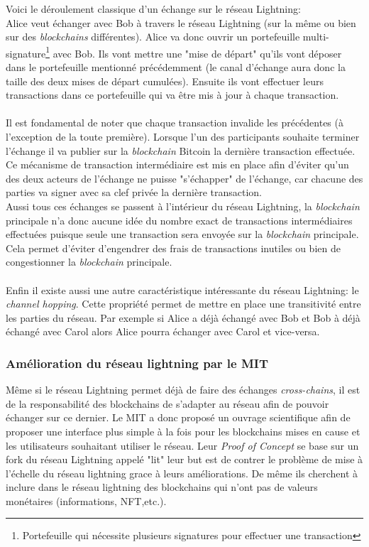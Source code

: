 Voici le déroulement classique d'un échange sur le réseau Lightning:\\ Alice veut échanger avec Bob à travers le réseau Lightning (sur la même ou bien sur des \textit{\gls{blockchain}s} différentes). 
Alice va donc ouvrir un portefeuille multi-signature\footnote{Portefeuille qui nécessite plusieurs signatures pour effectuer une transaction} avec Bob. Ils vont mettre une "mise de départ" qu'ils vont déposer dans le portefeuille mentionné précédemment (le canal d'échange aura donc la taille des deux mises de départ cumulées).
Ensuite ils vont effectuer leurs transactions dans ce portefeuille qui va être mis à jour à chaque transaction.\\ \\ 
Il est fondamental de noter que chaque transaction invalide les précédentes (à l'exception de la toute première). Lorsque l'un des participants souhaite terminer l'échange il va publier sur la \textit{\gls{blockchain}} \gls{Bitcoin} la dernière transaction effectuée.
Ce mécanisme de transaction intermédiaire est mis en place afin d'éviter qu'un des deux acteurs de l'échange ne puisse "s'échapper" de l'échange, car chacune des parties va signer avec sa clef privée la dernière transaction. \\
Aussi tous ces échanges se passent à l'intérieur du réseau Lightning, la \textit{\gls{blockchain}} principale n'a donc aucune idée du nombre exact de transactions intermédiaires effectuées puisque seule une transaction sera envoyée sur la \textit{\gls{blockchain}} principale. 
Cela permet d'éviter d'engendrer des frais de transactions inutiles ou bien de congestionner la \textit{\gls{blockchain}} principale.\\ \\
 Enfin il existe aussi une autre caractéristique intéressante du réseau Lightning: le \textit{channel hopping}. 
Cette propriété permet de mettre en place une transitivité entre les parties du réseau. Par exemple si Alice a déjà échangé avec Bob et Bob à déjà échangé avec Carol alors Alice pourra échanger avec Carol et vice-versa. 


\subsubsection{Amélioration du réseau lightning par le MIT}

Même si le réseau Lightning permet déjà de faire des échanges \textit{\gls{cross-chain}s}\cite{lightningCrossChain}, il est de la responsabilité des \gls{blockchain}s de s'adapter au réseau afin de pouvoir échanger sur ce dernier.
Le MIT a donc proposé un ouvrage scientifique\cite{mathus2018lightning} afin de proposer une interface plus simple à la fois pour les \gls{blockchain}s mises en cause et les utilisateurs souhaitant utiliser le réseau.
Leur \textit{Proof of Concept}\cite{pocMIT} se base sur un fork du réseau Lightning appelé "lit" leur but est de contrer le problème de mise à l'échelle du réseau lightning grace à leurs améliorations.
De même ils cherchent à inclure dans le réseau lightning des \gls{blockchain}s qui n'ont pas de valeurs monétaires (informations, NFT,etc.).

